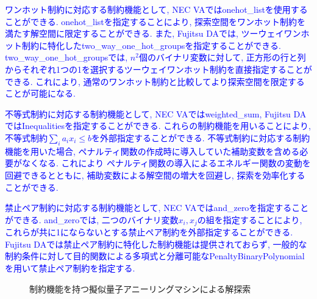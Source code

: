 \documentclass[submit,techrep,noauthor]{ipsj}
\begin{document}
\textcolor{blue}{ワンホット制約に対応する制約機能として, NEC VAではonehot\_listを使用することができる. onehot\_listを指定することにより, 探索空間をワンホット制約を満たす解空間に限定することができる. また, Fujitsu DAでは, ツーウェイワンホット制約に特化したtwo\_way\_one\_hot\_groupsを指定することができる. two\_way\_one\_hot\_groupsでは, $n^{2}$個のバイナリ変数に対して, 正方形の行と列からそれぞれ1つの1を選択するツーウェイワンホット制約を直接指定することができる. これにより, 通常のワンホット制約と比較してより探索空間を限定することが可能になる.}

\textcolor{blue}{不等式制約に対応する制約機能として, NEC VAではweighted\_sum, Fujitsu DAではInequalitiesを指定することができる. これらの制約機能を用いることにより, 不等式制約$\sum_{i}a_{i}x_{i}\le b$を外部指定することができる. 不等式制約に対応する制約機能を用いた場合, ペナルティ関数の作成時に導入していた補助変数を含める必要がなくなる. これにより ペナルティ関数の導入によるエネルギー関数の変動を回避できるとともに, 補助変数による解空間の増大を回避し, 探索を効率化することができる.}

\textcolor{blue}{禁止ペア制約に対応する制約機能として, NEC VAではand\_zeroを指定することができる. and\_zeroでは, 二つのバイナリ変数$x_{i}, x_{j}$の組を指定することにより, これらが共に1にならないとする禁止ペア制約を外部指定することができる. Fujitsu DAでは禁止ペア制約に特化した制約機能は提供されておらず, 一般的な制約条件に対して目的関数による多項式と分離可能なPenaltyBinaryPolynomialを用いて禁止ペア制約を指定する. }


\begin{figure}[ht]
\centering
{}
\hspace{5mm}
\caption{制約機能を持つ擬似量子アニーリングマシンによる解探索}
\label{va_search}
\end{figure}
\end{document}
